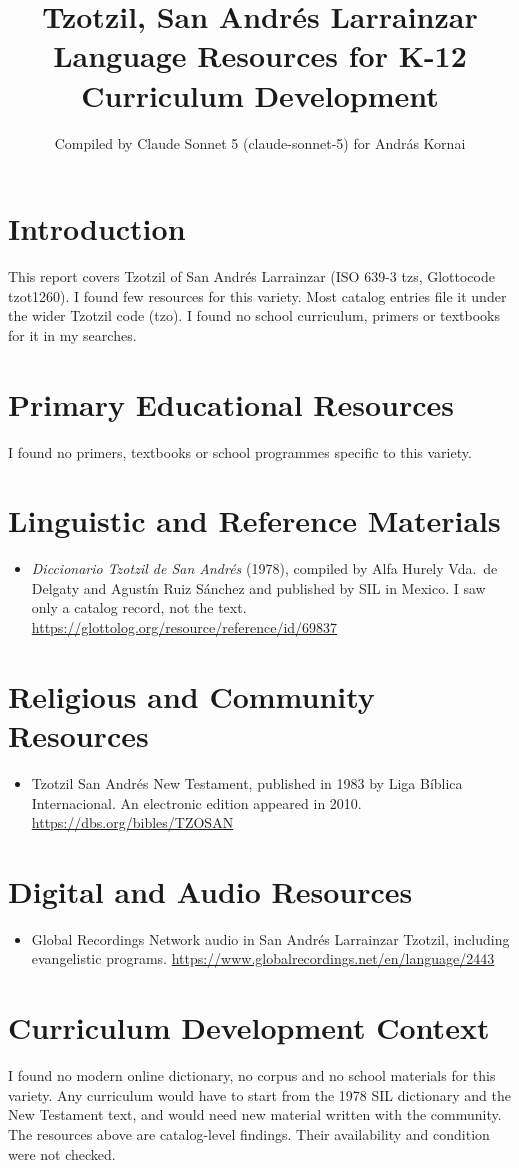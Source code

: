 \documentclass[12pt]{article}
\title{Tzotzil, San Andr\'es Larrainzar Language Resources for K-12 Curriculum Development}
\author{Compiled by Claude Sonnet 5 (claude-sonnet-5) for Andr\'as Kornai}
\date{}
\begin{document}
\maketitle

\section{Introduction}
This report covers Tzotzil of San Andr\'es Larrainzar (ISO 639-3 tzs, Glottocode tzot1260). I found few resources for this variety. Most catalog entries file it under the wider Tzotzil code (tzo). I found no school curriculum, primers or textbooks for it in my searches.

\section{Primary Educational Resources}
I found no primers, textbooks or school programmes specific to this variety.

\section{Linguistic and Reference Materials}
\begin{itemize}
\item \emph{Diccionario Tzotzil de San Andr\'es} (1978), compiled by Alfa Hurely Vda.\ de Delgaty and Agust\'in Ruiz S\'anchez and published by SIL in Mexico. I saw only a catalog record, not the text. \url{https://glottolog.org/resource/reference/id/69837}
\end{itemize}

\section{Religious and Community Resources}
\begin{itemize}
\item Tzotzil San Andr\'es New Testament, published in 1983 by Liga B\'iblica Internacional. An electronic edition appeared in 2010. \url{https://dbs.org/bibles/TZOSAN}
\end{itemize}

\section{Digital and Audio Resources}
\begin{itemize}
\item Global Recordings Network audio in San Andr\'es Larrainzar Tzotzil, including evangelistic programs. \url{https://www.globalrecordings.net/en/language/2443}
\end{itemize}

\section{Curriculum Development Context}
I found no modern online dictionary, no corpus and no school materials for this variety. Any curriculum would have to start from the 1978 SIL dictionary and the New Testament text, and would need new material written with the community. The resources above are catalog-level findings. Their availability and condition were not checked.
\end{document}
